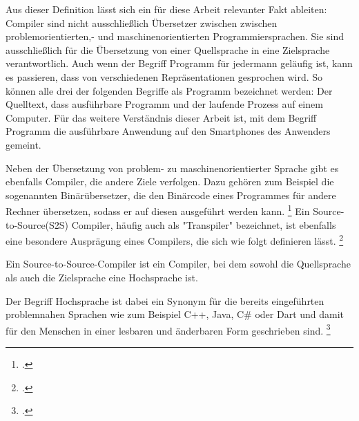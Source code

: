 Aus dieser Definition lässt sich ein für diese Arbeit relevanter Fakt ableiten: Compiler sind nicht ausschließlich Übersetzer zwischen zwischen problemorientierten,- und maschinenorientierten Programmiersprachen.  Sie sind ausschließlich für die Übersetzung von einer Quellsprache in eine Zielsprache verantwortlich.  Auch wenn der Begriff Programm für jedermann geläufig ist,  kann es  passieren,  dass von verschiedenen Repräsentationen gesprochen wird.  So können alle drei der folgenden Begriffe als Programm bezeichnet werden: Der Quelltext, dass ausführbare Programm und der laufende Prozess auf einem Computer.  Für das weitere Verständnis dieser Arbeit ist,  mit dem Begriff Programm die ausführbare Anwendung auf den Smartphones des Anwenders gemeint.  

Neben der Übersetzung von problem- zu maschinenorientierter Sprache gibt es ebenfalls Compiler, die andere Ziele verfolgen. Dazu gehören zum Beispiel die sogenannten Binärübersetzer,  die den Binärcode eines Programmes für andere Rechner übersetzen, sodass er auf diesen ausgeführt werden kann.  \footcite[Vgl.][S. 27]{Ullmann2008} Ein Source-to-Source(S2S) Compiler,  häufig auch als "Transpiler" bezeichnet,  ist ebenfalls eine besondere Ausprägung eines Compilers, die sich wie folgt definieren lässt.  \footcite[Vgl.][S. 1629]{IJCSIT2015}
\begin{Def}
Ein Source-to-Source-Compiler ist ein Compiler, bei dem sowohl die Quellsprache als auch die Zielsprache eine Hochsprache ist.
\end{Def}
\vspace{-1em}

Der Begriff Hochsprache ist dabei ein Synonym für die bereits eingeführten problemnahen Sprachen wie zum Beispiel C++,  Java,  C\# oder Dart und damit für den Menschen in einer lesbaren und änderbaren Form geschrieben sind. \footcite[Vgl.][S. 9]{Eisenecker2008} 

